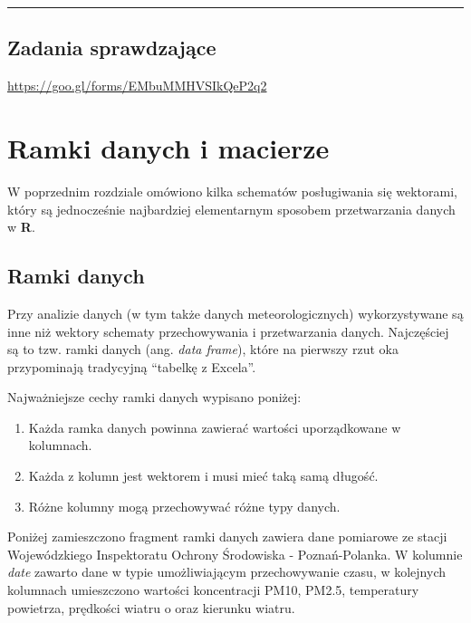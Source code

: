 \documentclass[]{book}
\providecommand{\tightlist}{%
  \setlength{\itemsep}{0pt}\setlength{\parskip}{0pt}}
\theoremstyle{definition}
\theoremstyle{definition}
\theoremstyle{definition}
\theoremstyle{remark}
\begin{document}
\begin{center}\rule{0.5\linewidth}{\linethickness}\end{center}

\section*{Zadania sprawdzające}\label{zadania-sprawdzajace-1}

\url{https://goo.gl/forms/EMbuMMHVSIkQeP2q2}

\chapter{Ramki danych i macierze}\label{ramki-danych-i-macierze}

W poprzednim rozdziale omówiono kilka schematów posługiwania się
wektorami, który są jednocześnie najbardziej elementarnym sposobem
przetwarzania danych w \textbf{R}.

\section{Ramki danych}\label{ramki-danych}

Przy analizie danych (w tym także danych meteorologicznych)
wykorzystywane są inne niż wektory schematy przechowywania i
przetwarzania danych. Najczęściej są to tzw. ramki danych (ang.
\emph{data frame}), które na pierwszy rzut oka przypominają tradycyjną
``tabelkę z Excela''.

Najważniejsze cechy ramki danych wypisano poniżej:

\begin{enumerate}
\def\labelenumi{\arabic{enumi}.}
\tightlist
\item
  Każda ramka danych powinna zawierać wartości uporządkowane w
  kolumnach.
\item
  Każda z kolumn jest wektorem i musi mieć taką samą długość.
\item
  Różne kolumny mogą przechowywać różne typy danych.
\end{enumerate}

Poniżej zamieszczono fragment ramki danych zawiera dane pomiarowe ze
stacji Wojewódzkiego Inspektoratu Ochrony Środowiska - Poznań-Polanka. W
kolumnie \emph{date} zawarto dane w typie umożliwiającym przechowywanie
czasu, w kolejnych kolumnach umieszczono wartości koncentracji PM10,
PM2.5, temperatury powietrza, prędkości wiatru o oraz kierunku wiatru.
\end{document}
